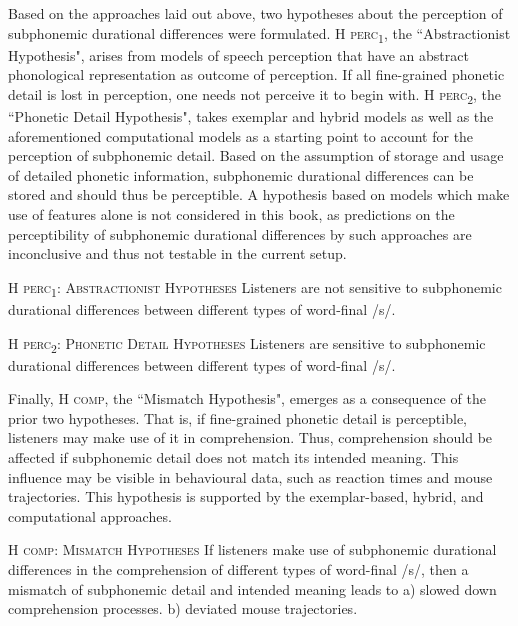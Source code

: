 Based on the approaches laid out above, two hypotheses about the perception of subphonemic durational differences were formulated. \textsc{H perc\textsubscript{1}}, the ``Abstractionist Hypothesis", arises from models of speech perception that have an abstract phonological representation as outcome of perception. If all fine-grained phonetic detail is lost in perception, one needs not perceive it to begin with. \textsc{H perc\textsubscript{2}}, the ``Phonetic Detail Hypothesis", takes exemplar and hybrid models as well as the aforementioned computational models as a starting point to account for the perception of subphonemic detail. Based on the assumption of storage and usage of detailed phonetic information, subphonemic durational differences can be stored and should thus be perceptible. A hypothesis based on models which make use of features alone is not considered in this book, as predictions on the perceptibility of subphonemic durational differences by such approaches are inconclusive and thus not testable in the current setup.

\begin{description}
\item\textsc{H perc\textsubscript{1}}: \textsc{Abstractionist Hypotheses} \newline
Listeners are not sensitive to subphonemic durational differences between different types of word-final /s/.

\item\textsc{H perc\textsubscript{2}}: \textsc{Phonetic Detail Hypotheses} \newline
Listeners are sensitive to subphonemic durational differences between different types of word-final /s/.
\end{description}

Finally, \textsc{H comp}, the ``Mismatch Hypothesis", emerges as a consequence of the prior two hypotheses. That is, if fine-grained phonetic detail is perceptible, listeners may make use of it in comprehension. Thus, comprehension should be affected if subphonemic detail does not match its intended meaning. This influence may be visible in behavioural data, such as reaction times and mouse trajectories. This hypothesis is supported by the exemplar-based, hybrid, and computational approaches.

\begin{description}

\item\textsc{H comp}: \textsc{Mismatch Hypotheses} \newline
If listeners make use of subphonemic durational differences in the comprehension of different types of word-final /s/, then a mismatch of subphonemic detail and intended meaning leads to\newline
a) slowed down comprehension processes.\newline
b) deviated mouse trajectories.

\end{description}

